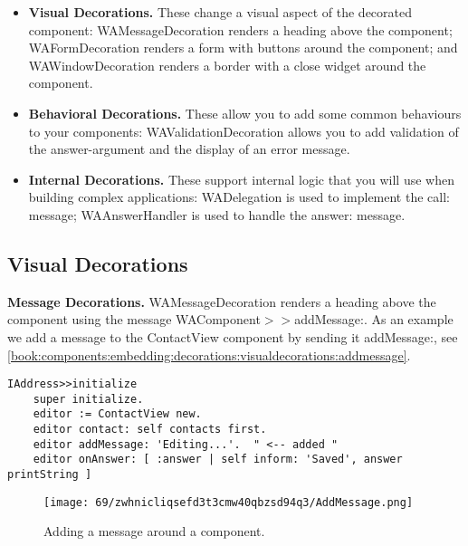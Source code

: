 \documentclass[a4paper,10pt,twoside]{book}
\newcommand{\ct}[1]{{\small\ttfamily\textup{#1}}}
\begin{document}
\begin{itemize}
\item  \textbf{Visual Decorations.} These change a visual aspect of the decorated component:  \ct{WAMessageDecoration} renders a heading above the component;  \ct{WAFormDecoration} renders a form with buttons around the component; and  \ct{WAWindowDecoration} renders a border with a close widget around the component.
\item  \textbf{Behavioral Decorations.} These allow you to add some common behaviours to your components:  \ct{WAValidationDecoration} allows you to add validation of the answer-argument and the display of an error message.
\item  \textbf{Internal Decorations.} These support internal logic that you will use when building complex applications:  \ct{WADelegation} is used to implement the \ct{call:} message;  \ct{WAAnswerHandler} is used to handle the \ct{answer:} message.
\end{itemize}

\subsection{Visual Decorations}
\label{book:components:embedding:decorations:visualdecorations}

\textbf{Message Decorations.}  \ct{WAMessageDecoration} renders a heading above the component using the message \ct{WAComponent$>$$>$addMessage:}. As an example we add a message to the \ct{ContactView} component by sending it \ct{addMessage:}, see \autoref{book:components:embedding:decorations:visualdecorations:addmessage}.

\begin{lstlisting}
IAddress>>initialize
    super initialize.
    editor := ContactView new.
    editor contact: self contacts first.
    editor addMessage: 'Editing...'.  " <-- added "
    editor onAnswer: [ :answer | self inform: 'Saved', answer printString ]
\end{lstlisting}

\begin{figure}[h!tbp]
	\begin{center}
		\texttt{[image: 69/zwhnicliqsefd3t3cmw40qbzsd94q3/AddMessage.png]}
		\caption{Adding a message around a component.\label{book:components:embedding:decorations:visualdecorations:addmessage}}
	\end{center}
\end{figure}
\end{document}
